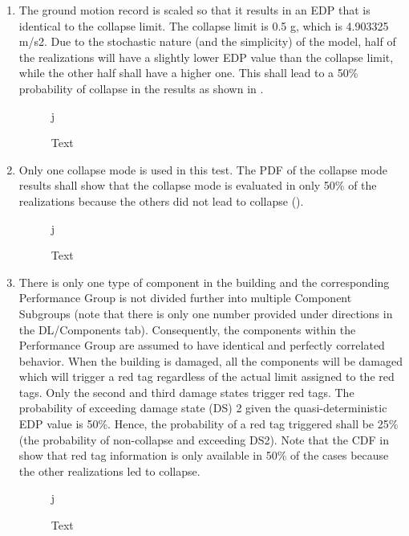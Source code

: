 \begin{enumerate}
    \item The ground motion record is scaled so that it results in an EDP that is identical to the collapse limit. The collapse limit is 0.5 g, which is 4.903325 m/s2. Due to the stochastic nature (and the simplicity) of the model, half of the realizations will have a slightly lower EDP value than the collapse limit, while the other half shall have a higher one. This shall lead to a 50\% probability of collapse in the results as shown in .
    
\begin{figure}[!htbp]j
  \caption{Text}
  \label{fig:ver_1_5}
\end{figure}

    \item Only one collapse mode is used in this test. The PDF of the collapse mode results shall show that the collapse mode is evaluated in only 50\% of the realizations because the others did not lead to collapse ().
    
\begin{figure}[!htbp]j
  \caption{Text}
  \label{fig:ver_1_6}
\end{figure}

    \item There is only one type of component in the building and the corresponding Performance Group is not divided further into multiple Component Subgroups (note that there is only one number provided under directions in the DL/Components tab). Consequently, the components within the Performance Group are assumed to have identical and perfectly correlated behavior. When the building is damaged, all the components will be damaged which will trigger a red tag regardless of the actual limit assigned to the red tags. Only the second and third damage states trigger red tags. The probability of exceeding damage state (DS) 2 given the quasi-deterministic EDP value is 50\%. Hence, the probability of a red tag triggered shall be 25\% (the probability of non-collapse and exceeding DS2). Note that the CDF in  show that red tag information is only available in 50\% of the cases because the other realizations led to collapse.
    
\begin{figure}[!htbp]j
  \caption{Text}
  \label{fig:ver_1_7}
\end{figure}


\end{enumerate}
